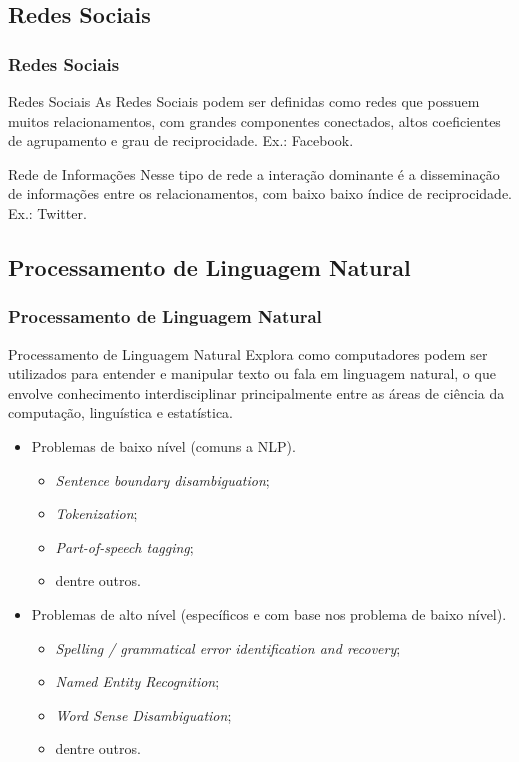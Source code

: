 \documentclass{beamer}
\begin{document}
\subsection{Redes Sociais}
\begin{frame}
\frametitle{Redes Sociais}
\begin{block}{Redes Sociais}
As Redes Sociais podem ser definidas como redes que possuem muitos relacionamentos, com grandes componentes conectados, altos coeficientes de agrupamento e grau de reciprocidade. Ex.: Facebook.
\end{block}
\begin{block}{Rede de Informações}
Nesse tipo de rede a interação dominante é a disseminação de informações entre os relacionamentos, com baixo baixo índice de reciprocidade. Ex.: Twitter.
\end{block}
\end{frame}
\subsection{Processamento de Linguagem Natural}
\begin{frame}
\frametitle{Processamento de Linguagem Natural}
\begin{block}{{Processamento de Linguagem Natural}}
Explora como computadores podem ser utilizados para entender e manipular texto ou fala em linguagem natural, o que envolve conhecimento interdisciplinar principalmente entre as áreas de ciência da computação, linguística e estatística.
\end{block}
\begin{multicols}{2}
\begin{itemize}
\item Problemas de baixo nível (comuns a NLP).
\begin{itemize}
\item \textit{Sentence boundary disambiguation};
\item \textit{Tokenization};
\item \textit{Part-of-speech tagging};
\item dentre outros.
\end{itemize}
\end{itemize}

\columnbreak

\begin{itemize}
\item Problemas de alto nível (específicos e com base nos problema de baixo nível).
\begin{itemize}
\item \textit{Spelling / grammatical error identification and recovery};
\item \textit{Named Entity Recognition};
\item \textit{Word Sense Disambiguation};
\item dentre outros.
\end{itemize}
\end{itemize}
\end{multicols}
\end{frame}
\end{document}
